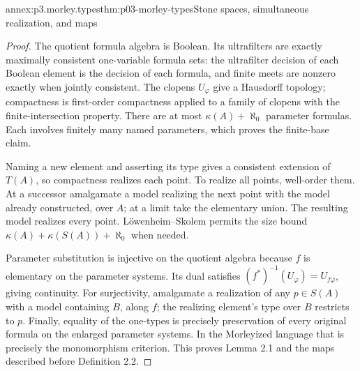 \begin{annexitem}{annex:p3.morley.types}{thm:p03-morley-types}{Stone spaces, simultaneous realization, and maps}
\begin{proof}
The quotient formula algebra is Boolean. Its ultrafilters are
exactly maximally consistent one-variable formula sets: the
ultrafilter decision of each Boolean element is the decision of
each formula, and finite meets are nonzero exactly when jointly
consistent. The clopens \(U_\varphi\) give a Hausdorff topology;
compactness is first-order compactness applied to a family of
clopens with the finite-intersection property. There are at most
\(\kappa(A)+\aleph_0\) parameter formulas. Each involves
finitely many named parameters, which proves the finite-base claim.

Naming a new element and asserting its type gives a consistent
extension of \(T(A)\), so compactness realizes each point. To
realize all points, well-order them. At a successor amalgamate a
model realizing the next point with the model already constructed,
over \(A\); at a limit take the elementary union. The resulting
model realizes every point. Löwenheim--Skolem permits the size
bound \(\kappa(A)+\kappa(S(A))+\aleph_0\) when needed.

Parameter substitution is injective on the quotient algebra because
\(f\) is elementary on the parameter systems. Its dual satisfies
\((f^*)^{-1}(U_\varphi)=U_{f\varphi}\), giving continuity.
For surjectivity, amalgamate a realization of any \(p\in S(A)\)
with a model containing \(B\), along \(f\); the realizing element's
type over \(B\) restricts to \(p\). Finally, equality of the
one-types is precisely preservation of every original formula
on the enlarged parameter systems. In the Morleyized language
that is precisely the monomorphism criterion. This proves
Lemma 2.1 and the maps described before Definition 2.2.
\end{proof}
\end{annexitem}

